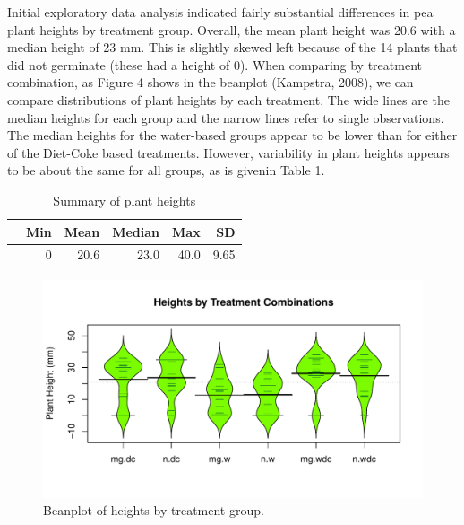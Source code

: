 \documentclass[1p,12pt]{elsarticle}\usepackage[]{graphicx}\usepackage[]{color}
\makeatletter
\def\maxwidth{ %
  \ifdim\Gin@nat@width>\linewidth
    \linewidth
  \else
    \Gin@nat@width
  \fi
}
\newenvironment{knitrout}{}{} %
\makeatother
\begin{document}
Initial exploratory data analysis indicated fairly substantial differences in pea plant heights by treatment group. Overall, the mean plant height was 20.6 with a median height of 23 mm. This is slightly skewed left because of the 14 plants that did not germinate (these had a height of 0). When comparing by treatment combination, as Figure 4 shows in the beanplot (Kampstra, 2008), we can compare distributions of plant heights by each treatment. The wide lines are the median heights for each group and the narrow lines refer to single observations. The median heights for the water-based groups appear to be lower than for either of the Diet-Coke based treatments. However, variability in plant heights appears to be about the same for all groups, as is givenin Table 1. 

\begin{table}[ht]
\centering
\begin{tabular}{rrrrrr}
  \hline
 & Min & Mean & Median & Max & SD \\ 
  \hline
 & 0 & 20.6 & 23.0 & 40.0 & 9.65\\ 
  
   \hline
\end{tabular}
\caption{Summary of plant heights}
\end{table}

\begin{knitrout}
\color{fgcolor}\begin{figure}
\includegraphics[width=\maxwidth]{figure/eda-1} \caption[Beanplot of heights by treatment group]{Beanplot of heights by treatment group.}\label{fig:eda}
\end{figure}


\end{knitrout}
\end{document}
